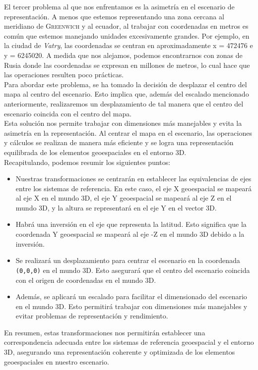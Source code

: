 \documentclass[a4paper, 11pt]{book}
\begin{document}
El tercer problema al que nos enfrentamos es la asimetría en el escenario de representación. A menos que estemos representando una zona cercana al meridiano de \textsc{Greenwich} y al ecuador, al trabajar con coordenadas en metros es común que estemos manejando unidades excesivamente grandes. Por ejemplo, en la ciudad de \emph{Vatry}, las coordenadas se centran en aproximadamente x = 472476 e y = 6245020. A medida que nos alejamos, podemos encontrarnos con zonas de Rusia donde las coordenadas se expresan en millones de metros, lo cual hace que las operaciones resulten poco prácticas.\\
Para abordar este problema, se ha tomado la decisión de desplazar el centro del mapa al centro del escenario. Esto implica que, además del escalado mencionado anteriormente, realizaremos un desplazamiento de tal manera que el centro del escenario coincida con el centro del mapa.\\
Esta solución nos permite trabajar con dimensiones más manejables y evita la asimetría en la representación. Al centrar el mapa en el escenario, las operaciones y cálculos se realizan de manera más eficiente y se logra una representación equilibrada de los elementos geoespaciales en el entorno 3D.\\
Recapitulando, podemos resumir los siguientes puntos:
\begin{itemize}
    \item Nuestras transformaciones se centrarán en establecer las equivalencias de ejes entre los sistemas de referencia. En este caso, el eje \textsc{X} geoespacial se mapeará al eje X en el mundo \textsc{3D}, el eje Y geoespacial se mapeará al eje \textsc{Z} en el mundo \textsc{3D}, y la altura se representará en el eje Y en el vector 3D.
    \item Habrá una inversión en el eje que representa la latitud. Esto significa que la coordenada Y geoespacial se mapeará al eje \textsc{-Z} en el mundo \textsc{3D} debido a la inversión.
    \item Se realizará un desplazamiento para centrar el escenario en la coordenada \texttt{(0,0,0)} en el mundo \textsc{3D}. Esto asegurará que el centro del escenario coincida con el origen de coordenadas en el mundo \textsc{3D}.
    \item Además, se aplicará un escalado para facilitar el dimensionado del escenario en el mundo \textsc{3D}. Esto permitirá trabajar con dimensiones más manejables y evitar problemas de representación y rendimiento.
\end{itemize}
En resumen, estas transformaciones nos permitirán establecer una correspondencia adecuada entre los sistemas de referencia geoespacial y el entorno 3D, asegurando una representación coherente y optimizada de los elementos geoespaciales en nuestro escenario.
\end{document}
